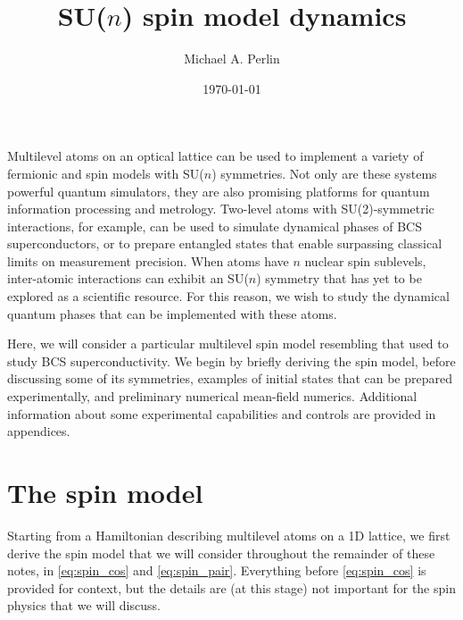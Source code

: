 \documentclass[nofootinbib,notitlepage,11pt]{revtex4-2}
\newcommand{\1}{\mathds{1}}
\begin{document}
\thispagestyle{fancy}

\title{SU($n$) spin model dynamics}%
\author{Michael A. Perlin}%
\date{\today}


\maketitle
\begin{singlespace}
  \tableofcontents
\end{singlespace}
\vspace{1cm}

Multilevel atoms on an optical lattice can be used to implement a variety of fermionic and spin models with SU($n$) symmetries.
Not only are these systems powerful quantum simulators, they are also promising platforms for quantum information processing and metrology.
Two-level atoms with SU(2)-symmetric interactions, for example, can be used to simulate dynamical phases of BCS superconductors, or to prepare entangled states that enable surpassing classical limits on measurement precision.
When atoms have $n$ nuclear spin sublevels, inter-atomic interactions can exhibit an SU($n$) symmetry that has yet to be explored as a scientific resource.
For this reason, we wish to study the dynamical quantum phases that can be implemented with these atoms.

Here, we will consider a particular multilevel spin model resembling that used to study BCS superconductivity.
We begin by briefly deriving the spin model, before discussing some of its symmetries, examples of initial states that can be prepared experimentally, and preliminary numerical mean-field numerics.
Additional information about some experimental capabilities and controls are provided in appendices.

\section{The spin model}

Starting from a Hamiltonian describing multilevel atoms on a 1D lattice, we first derive the spin model that we will consider throughout the remainder of these notes, in \eqref{eq:spin_cos} and \eqref{eq:spin_pair}.
Everything before \eqref{eq:spin_cos} is provided for context, but the details are (at this stage) not important for the spin physics that we will discuss.
\end{document}
